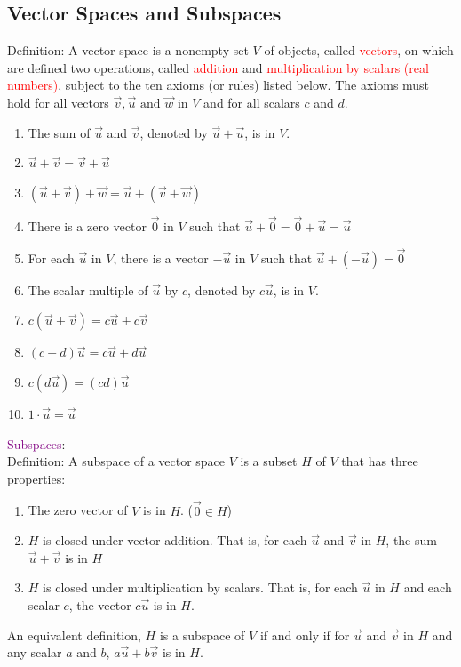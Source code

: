 \documentclass[12pt]{article}
\begin{document}
\subsection{Vector Spaces and Subspaces}
Definition: A vector space is a nonempty set $V$ of objects, called \textcolor{red}{vectors}, on which are defined two operations, called \textcolor{red}{addition} and \textcolor{red}{multiplication by scalars (real numbers)}, subject to the ten axioms (or rules) listed below. The axioms must hold for all vectors $\vec{v}, \vec{u} \text{ and }\vec{w}$ in $V$ and for all scalars $c$ and $d$.
\begin{enumerate}
    \item The sum of $\vec{u}$ and $\vec{v}$, denoted by $\vec{u} + \vec{u}$, is in $V$.
    \item $\vec{u} + \vec{v} = \vec{v} + \vec{u}$
    \item $(\vec{u} + \vec{v}) + \vec{w} = \vec{u} + (\vec{v} + \vec{w})$
    \item There is a zero vector $\vec{0}$ in $V$ such that $\vec{u} + \vec{0} = \vec{0} + \vec{u} = \vec{u}$
    \item For each $\vec{u}$ in $V$, there is a vector $-\vec{u}$ in $V$ such that $\vec{u} + (-\vec{u}) = \vec{0}$
    \item The scalar multiple of $\vec{u}$ by $c$, denoted by $c\vec{u}$, is in $V$.
    \item $c(\vec{u} + \vec{v}) = c\vec{u} + c\vec{v}$
    \item $(c+d)\vec{u} = c\vec{u} + d\vec{u}$
    \item $c(d\vec{u}) = (cd)\vec{u}$
    \item $1\cdot\vec{u} = \vec{u}$
\end{enumerate}


\textcolor{purple}{Subspaces}:
\\
Definition: A subspace of a vector space $V$ is a subset $H$ of $V$ that has three properties: 
\begin{enumerate}
    \item The zero vector of $V$ is in $H$. ($\vec{0} \in H$)
    \item $H$ is closed under vector addition. That is, for each $\vec{u}$ and $\vec{v}$ in $H$, the sum $\vec{u} + \vec{v}$ is in $H$
    \item $H$ is closed under multiplication by scalars. That is, for each $\vec{u}$ in $H$ and each scalar $c$, the vector $c\vec{u}$ is in $H$.
\end{enumerate}
An equivalent definition, $H$ is a subspace of $V$ if and only if for $\vec{u}$ and $\vec{v}$ in $H$ and any scalar $a$ and $b$, $a\vec{u} + b\vec{v}$ is in $H$.
\end{document}
